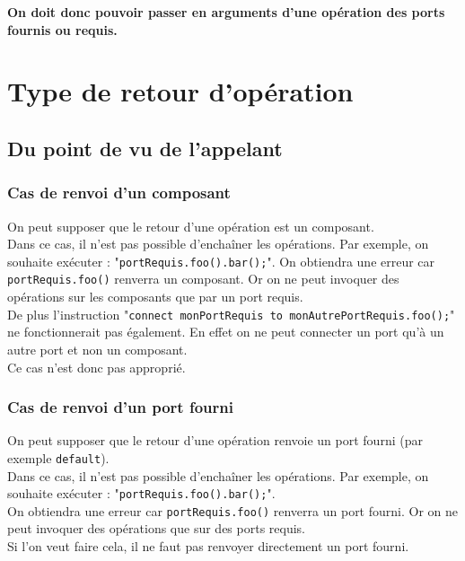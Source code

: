 \documentclass[11pt,a4paper,openany,oneside]{book}
\begin{document}
\textbf{On doit donc pouvoir passer en arguments d'une opération des ports fournis ou requis.}

\section{Type de retour d'opération}

\subsection{Du point de vu de l'appelant}

\subsubsection{Cas de renvoi d'un composant}
On peut supposer que le retour d'une opération est un composant.\\
Dans ce cas, il n'est pas possible d'enchaîner les opérations. Par exemple, on souhaite exécuter : "\texttt{portRequis.foo().bar();}". On obtiendra une erreur car \texttt{portRequis.foo()} renverra un composant. Or on ne peut invoquer des opérations sur les composants que par un port requis.\\
De plus l'instruction "\texttt{connect monPortRequis to monAutrePortRequis.foo();}" ne fonctionnerait pas également. En effet on ne peut connecter un port qu'à un autre port et non un composant.\\
Ce cas n'est donc pas approprié.

\subsubsection{Cas de renvoi d'un port fourni}
On peut supposer que le retour d'une opération renvoie un port fourni (par exemple \texttt{default}).\\
Dans ce cas, il n'est pas possible d'enchaîner les opérations. Par exemple, on souhaite exécuter : "\texttt{portRequis.foo().bar();}".\\
On obtiendra une erreur car \texttt{portRequis.foo()} renverra un port fourni. Or on ne peut invoquer des opérations que sur des ports requis.\\
Si l'on veut faire cela, il ne faut pas renvoyer directement un port fourni.
\end{document}
